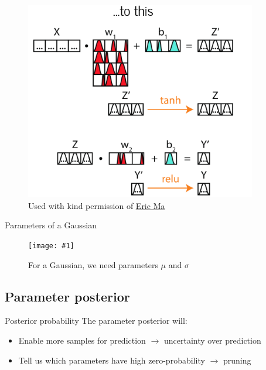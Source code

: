 \documentclass{beamer}
\newcommand{\fitfigure}[1]{\centering\texttt{[image: \#1]}}
\newcommand{\mdlink}[2]{\href{#2}{\underline{#1}}}
\begin{document}
\begin{frame}
	\begin{figure}
		\centering
		\includegraphics[width = 0.9\textwidth]{im/going_bayesian2.png}
		\caption{Used with kind permission of \mdlink{Eric Ma}{https://ericmjl.github.io/}}
	\end{figure}
\end{frame}

\begin{frame}{Parameters of a Gaussian}
	\begin{figure}
		\fitfigure{im/gaussian_mu_sigma.png}
		\caption{For a Gaussian, we need parameters $\mu$ and $\sigma$}
	\end{figure}
\end{frame}



\subsection{Parameter posterior}

\begin{frame}{Posterior probability}
	The parameter posterior will:
	\begin{itemize}
		\item Enable more samples for prediction $\rightarrow$ uncertainty over prediction
		\item Tell us which parameters have high zero-probability $\rightarrow$ pruning
	\end{itemize}
\end{frame}
\end{document}
